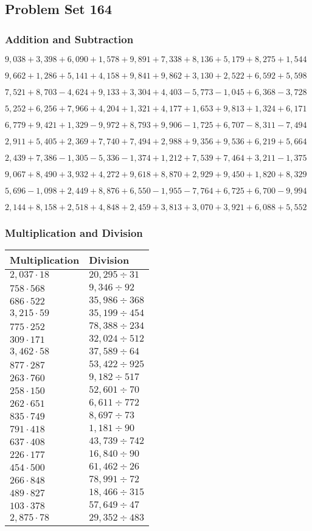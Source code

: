 \hypertarget{problem-set-164}{%
\subsection{Problem Set 164}\label{problem-set-164}}

\hypertarget{addition-and-subtraction}{%
\subsubsection{Addition and
Subtraction}\label{addition-and-subtraction}}

\(9,038+3,398+6,090+1,578+9,891+7,338+8,136+5,179+8,275+1,544\)

\(9,662+1,286+5,141+4,158+9,841+9,862+3,130+2,522+6,592+5,598\)

\(7,521+8,703-4,624+9,133+3,304+4,403-5,773-1,045+6,368-3,728\)

\(5,252+6,256+7,966+4,204+1,321+4,177+1,653+9,813+1,324+6,171\)

\(6,779+9,421+1,329-9,972+8,793+9,906-1,725+6,707-8,311-7,494\)

\(2,911+5,405+2,369+7,740+7,494+2,988+9,356+9,536+6,219+5,664\)

\(2,439+7,386-1,305-5,336-1,374+1,212+7,539+7,464+3,211-1,375\)

\(9,067+8,490+3,932+4,272+9,618+8,870+2,929+9,450+1,820+8,329\)

\(5,696-1,098+2,449+8,876+6,550-1,955-7,764+6,725+6,700-9,994\)

\(2,144+8,158+2,518+4,848+2,459+3,813+3,070+3,921+6,088+5,552\)

\hypertarget{multiplication-and-division}{%
\subsubsection{Multiplication and
Division}\label{multiplication-and-division}}

\begin{longtable}[]{@{}ll@{}}
\toprule
Multiplication & Division\tabularnewline
\midrule
\endhead
\(2,037\cdot18\) & \(20,295÷31\)\tabularnewline
\(758\cdot568\) & \(9,346÷92\)\tabularnewline
\(686\cdot522\) & \(35,986÷368\)\tabularnewline
\(3,215\cdot59\) & \(35,199÷454\)\tabularnewline
\(775\cdot252\) & \(78,388÷234\)\tabularnewline
\(309\cdot171\) & \(32,024÷512\)\tabularnewline
\(3,462\cdot58\) & \(37,589÷64\)\tabularnewline
\(877\cdot287\) & \(53,422÷925\)\tabularnewline
\(263\cdot760\) & \(9,182÷517\)\tabularnewline
\(258\cdot150\) & \(52,601÷70\)\tabularnewline
\(262\cdot651\) & \(6,611÷772\)\tabularnewline
\(835\cdot749\) & \(8,697÷73\)\tabularnewline
\(791\cdot418\) & \(1,181÷90\)\tabularnewline
\(637\cdot408\) & \(43,739÷742\)\tabularnewline
\(226\cdot177\) & \(16,840÷90\)\tabularnewline
\(454\cdot500\) & \(61,462÷26\)\tabularnewline
\(266\cdot848\) & \(78,991÷72\)\tabularnewline
\(489\cdot827\) & \(18,466÷315\)\tabularnewline
\(103\cdot378\) & \(57,649÷47\)\tabularnewline
\(2,875\cdot78\) & \(29,352÷483\)\tabularnewline
\bottomrule
\end{longtable}
